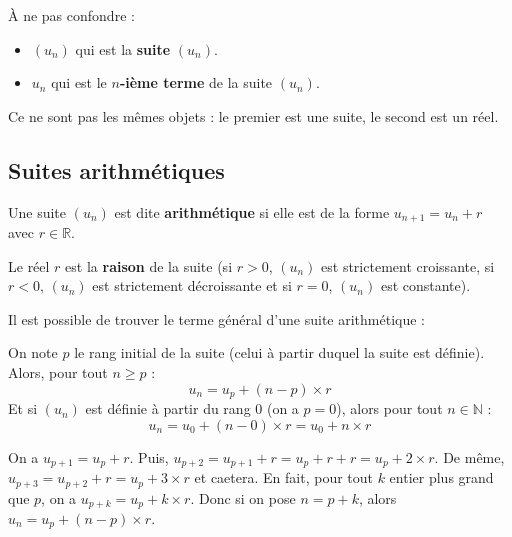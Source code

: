 	\begin{tip}
		À ne pas confondre :
		\begin{itemize}
			\item $(u_n)$ qui est la \textbf{suite} $(u_n)$.
			\item $u_n$ qui est le \textbf{$n$-ième terme} de la suite $(u_n)$.
		\end{itemize}
		Ce ne sont pas les mêmes objets : le premier est une suite, le second est un réel.
	\end{tip}

	\subsection{Suites arithmétiques}

	\begin{formula}[Définition]
		Une suite $(u_n)$ est dite \textbf{arithmétique} si elle est de la forme $u_{n+1} = u_n + r$ avec $r \in \mathbb{R}$.
	\end{formula}

	\begin{formula}[Raison]
		Le réel $r$ est la \textbf{raison} de la suite (si $r > 0$, $(u_n)$ est strictement croissante, si $r < 0$, $(u_n)$ est strictement décroissante et si $r = 0$, $(u_n)$ est constante).
	\end{formula}

	Il est possible de trouver le terme général d'une suite arithmétique :

	\begin{formula}
		On note $p$ le rang initial de la suite (celui à partir duquel la suite est définie). Alors, pour tout $n \geq p$ :
		\[ u_n = u_p + (n-p) \times r \]
		Et si $(u_n)$ est définie à partir du rang $0$ (on a $p = 0$), alors pour tout $n \in \mathbb{N}$ :
		\[ u_n = u_0 + (n-0) \times r = u_0 + n \times r \]
	\end{formula}

	\begin{demonstration}
		On a $u_{p+1} = u_p + r$. Puis, $u_{p+2} = u_{p+1} + r = u_p + r + r = u_p + 2 \times r$. De même, $u_{p+3} = u_{p+2} + r = u_p + 3 \times r$  et caetera.
		\newline
		En fait, pour tout $k$ entier plus grand que $p$, on a $u_{p+k} = u_p + k \times r$.
		\newline
		Donc si on pose $n = p+k$, alors $u_n = u_p + (n-p) \times r$.
	\end{demonstration}

